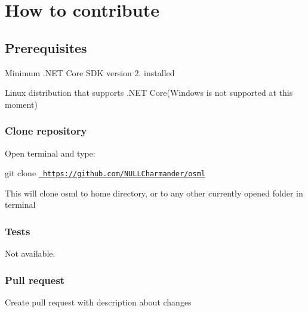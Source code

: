 \section*{How to contribute}

\subsection*{Prerequisites}


\begin{DoxyItemize}
\item Minimum .N\+ET Core S\+DK version 2. installed
\item Linux distribution that supports .N\+ET Core(\+Windows is not supported at this moment)
\end{DoxyItemize}

\subsubsection*{Clone repository}

Open terminal and type\+:

git clone \href{https://github.com/NULLCharmander/osml}{\texttt{ https\+://github.\+com/\+N\+U\+L\+L\+Charmander/osml}}

This will clone osml to home directory, or to any other currently opened folder in terminal

\subsubsection*{Tests}

Not available.

\subsubsection*{Pull request}

Create pull request with description about changes 